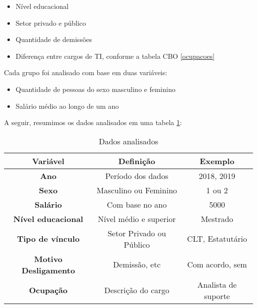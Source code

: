 \begin{itemize}
	\item Nível educacional 	      	      	      	      	      
	\item Setor privado e público	      	      	      	      	     
	\item Quantidade de demissões    	      	      	      	     
	\item Diferença entre cargos de TI, conforme a tabela CBO \ref{ocupacoes}    	      	      	     
\end{itemize}
	      	      	    
Cada grupo foi analisado com base em duas variáveis:

\begin{itemize}
	\item Quantidade de pessoas do sexo masculino e feminino	      	      	      	      	      
	\item Salário médio ao longo de um ano	    
\end{itemize}
	      	      	      
A seguir, resumimos os dados analisados em uma tabela \ref{vars}:     

\begin{table}[htbp]
	\caption{Dados analisados}
	\begin{center}
		\begin{tabular}{|c|c|c|}
			\hline
			\textbf{Variável}           & \textbf{Definição}      & \textbf{Exemplo}    \\ 
			\hline 
			\textbf{Ano}                 & Período dos dados        & 2018, 2019          \\
			\hline
			\textbf{Sexo}                & Masculino ou Feminino     & 1 ou 2              \\
			\hline
			\textbf{Salário}            & Com base no ano           & 5000                \\
			\hline 
			\textbf{Nível educacional}  & Nível médio e superior  & Mestrado            \\
			\hline 
			\textbf{Tipo de vínculo}    & Setor Privado ou Público & CLT, Estatutário   \\
			\hline 
			\textbf{Motivo Desligamento} & Demissão, etc            & Com acordo, sem     \\
			\hline
			\textbf{Ocupação}          & Descrição do cargo      & Analista de suporte \\
			\hline 
		\end{tabular}
		\label{vars}
	\end{center} 
\end{table}      	      

